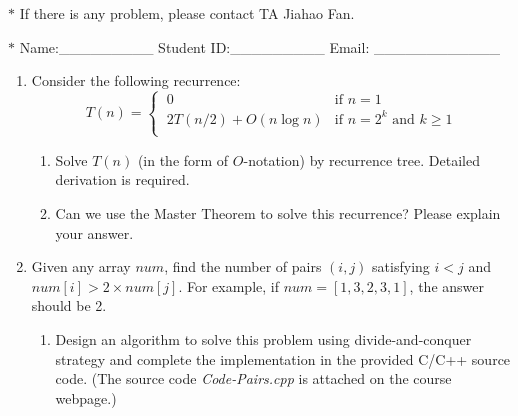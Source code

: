 \documentclass[12pt,a4paper]{article}
\makeatletter
\newtheorem*{solution}{Solution}
\theoremstyle{definition}
\renewenvironment{solution}[1][Solution] {\par\pushQED{\qed}\normalfont\topsep6\p@\@plus6\p@\relax\trivlist\item[\hskip\labelsep\bfseries#1\@addpunct{.}]\ignorespaces}{\popQED\endtrivlist\@endpefalse} \makeatother
\makeatother
\begin{document}
\noindent

\noindent{}
\begin{center}
\footnotesize{\color{red}$*$ If there is any problem, please contact TA Jiahao Fan.}

\footnotesize{\color{blue}$*$ Name:\_\_\_\_\_\_\_\_\_  \quad Student ID:\_\_\_\_\_\_\_\_\_ \quad Email: \_\_\_\_\_\_\_\_\_\_\_\_}
\end{center}

\begin{enumerate}
    \item
    Consider the following recurrence:
    \begin{equation*}
    T(n)=
    \begin{cases}
    \ 0 & \text{if } n=1 \\
    \ 2T(n/2)+O(n\log{n}) & \text{if } n=2^k \text{ and } k \geq 1 \\
    \end{cases}
    \end{equation*}
    \begin{enumerate}
        \item
        Solve $T(n)$ (in the form of $O$-notation) by recurrence tree. Detailed derivation is required.

        \item
        Can we use the Master Theorem to solve this recurrence? Please explain your answer.

    \end{enumerate}

    \item
    Given any array $num$, find the number of pairs $(i, j)$ satisfying $i < j$ and $num[i] > 2 \times num[j]$. For example, if $num=[1,3,2,3,1]$, the answer should be 2.
    \begin{enumerate}
        \item
         Design an algorithm to solve this problem using divide-and-conquer strategy and complete the implementation in the provided C/C++ source code. {\color{blue}(The source code \emph{Code-Pairs.cpp} is attached on the course webpage.)}


\end{enumerate}
\end{enumerate}
\end{document}
